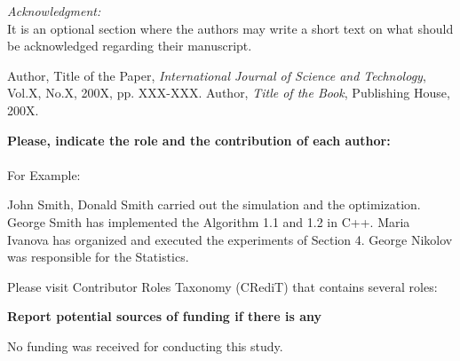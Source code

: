 \documentclass{wseas}
\begin{document}
\flushleft \par{\textit {Acknowledgment:}}\\
It is an optional section where the authors may write a short text on what should be acknowledged regarding their manuscript.



\begin{thebibliography}{9}
 Author, Title of the Paper, \textit{International Journal of Science and Technology}, Vol.X, No.X, 200X, pp. XXX-XXX.
   Author, \textit{Title of the Book}, Publishing House, 200X.

\end{thebibliography}


\flushleft {}
\par{{\color{red}
\noindent \textbf{Please, indicate the role and the contribution of each author:}\\ 
\\
For Example:}}
\par{
\noindent 
 {John Smith, Donald Smith carried out the simulation and the optimization.  }\break
George Smith has implemented the Algorithm 1.1 and 1.2 in C++.  \break
Maria Ivanova has organized and executed the experiments of Section 4.  \break
George Nikolov was responsible for the Statistics.  \break

\noindent Please visit Contributor Roles Taxonomy (CRediT) that contains several roles:
\href{www.wseas.org/multimedia/contributor-roleinstruction.pdf}{\color{blue}{www.wseas.org/multimedia/contributor-roleinstruction.pdf}}

\flushleft {}

\flushleft {}
\par{{\color{red}
\noindent \textbf{Report potential sources of funding if there is any}}}


\flushleft {}
\par { \noindent No funding was received for conducting this study.}
\break

\flushleft {}
\par { }

\flushleft {}}
\par  {}
\end{document}
